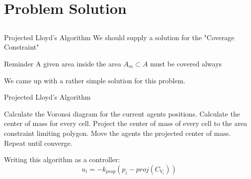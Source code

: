 \documentclass[t]{beamer}
\begin{document}

\section[Problem Solution]{Problem Solution}

\subsection[Projected Lloyd's Algorithm]{}
\begin{frame}[label=projlloydsalgo1]{Projected Lloyd's Algorithm}
We should supply a solution for the "Coverage Constraint" \pause
\begin{block}{Reminder}
A given area inside the area $A_{m} \subset A$ must be covered always
\end{block}\pause
We came up with a rather simple solution for this problem.
\end{frame}

\begin{frame}[label=projlloydsalgo2]{Projected Lloyd's Algorithm}
\begin{algorithm}[H]
\caption{Projected Lloyd's Algorithm (PLA)}\label{ProjLloydsAlgorithm}
\begin{algorithmic}[1]
\State Calculate the Voronoi diagram for the current agents positions.
\State Calculate the center of mass for every cell.
\State Project the center of mass of every cell to the area constraint limiting polygon.
\State Move the agents the projected center of mass.
\State Repeat until converge.
\end{algorithmic}
\end{algorithm}

Writing this algorithm as a controller:
\begin{equation} \label{ProjectedLloydsContol}
u_{i} = -k_{prop}\left( p_i - \textit{proj}\left( C_{V_{i}} \right) \right)
\end{equation} 
\end{frame}
\end{document}
